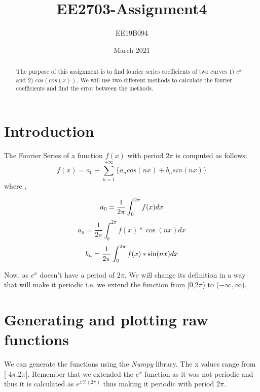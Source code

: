\documentclass[11pt, a4paper]{article}
\title{EE2703-Assignment4}
\author{EE19B094 }
\date{March 2021}
\begin{document}
\maketitle
\newpage

\begin{abstract}
     The purpose of this assignment is to find fourier series coefficients of two curves 1) $e^x$ and 2) $cos(cos(x))$. We will use two different methods to calculate the fourier coefficients and find the error between the methods.
\end{abstract}




\section{Introduction}
\par The Fourier Series of a function $f(x)$ with period $2\pi$ is computed as follows:
\begin{equation}
    f(x) = a_0 + \sum_{n=1}^{+\infty}\{ a_ncos(nx) +b_nsin(nx)\}
\end{equation}
\newline
where , \newline

\begin{equation}
    a_0 = \frac{1}{2\pi} \int_0^{2\pi}f(x)dx\\
\end{equation}
\begin{equation}
    a_n = \frac{1}{2\pi} \int_0^{2\pi}f(x)*\cos(nx)dx
\end{equation}
\begin{equation}
    b_n = \frac{1}{2\pi} \int_0^{2\pi}f(x)*\sin(nx)dx\\
\end{equation}
    
Now, as $e^x$ doesn't have a period of $2\pi$, We will change its definition in a way that will make it periodic i.e. we extend the function from [0,$2\pi$) to ($-\infty,\infty$).



\section{Generating and plotting raw functions}
\par We can generate the functions using the \emph{Numpy} library. The x values range from [-4$\pi$,2$\pi$]. Remember that we extended the $e^x$ function as it was not periodic and thus it is calculated as $e^{x\%(2\pi)}$ thus making it periodic with period 2$\pi$.
\end{document}
